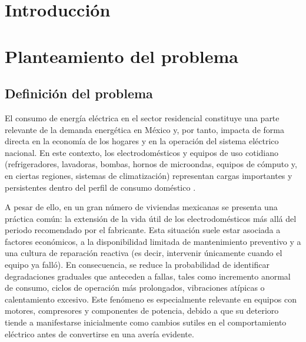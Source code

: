﻿\documentclass[12pt,openright,oneside]{report}
\theoremstyle{mytheoremstyle}
\theoremstyle{mytheoremstyle}
\theoremstyle{myproblemstyle}
\begin{document}

\tableofcontents
\listoftables
\listoffigures

\clearpage
{}

\chapter*{Introducción}

\chapter{Planteamiento del problema}

\section{Definición del problema}

El consumo de energía eléctrica en el sector residencial constituye una parte relevante de la demanda energética en México y, por tanto, impacta de forma directa en la economía de los hogares y en la operación del sistema eléctrico nacional. En este contexto, los electrodomésticos y equipos de uso cotidiano (refrigeradores, lavadoras, bombas, hornos de microondas, equipos de cómputo y, en ciertas regiones, sistemas de climatización) representan cargas importantes y persistentes dentro del perfil de consumo doméstico \cite{sener-balance-nacional-energia}.

A pesar de ello, en un gran número de viviendas mexicanas se presenta una práctica común: la extensión de la vida útil de los electrodomésticos más allá del periodo recomendado por el fabricante. Esta situación suele estar asociada a factores económicos, a la disponibilidad limitada de mantenimiento preventivo y a una cultura de reparación reactiva (es decir, intervenir únicamente cuando el equipo ya falló). En consecuencia, se reduce la probabilidad de identificar degradaciones graduales que anteceden a fallas, tales como incremento anormal de consumo, ciclos de operación más prolongados, vibraciones atípicas o calentamiento excesivo. Este fenómeno es especialmente relevante en equipos con motores, compresores y componentes de potencia, debido a que su deterioro tiende a manifestarse inicialmente como cambios sutiles en el comportamiento eléctrico antes de convertirse en una avería evidente.
\end{document}
